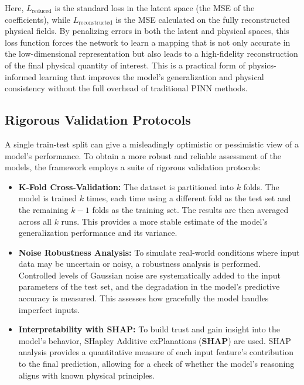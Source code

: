 \documentclass[dsc, EN]{ufabcFHZh}
\begin{document}
{Here, $L_{\text{reduced}}$ is the standard loss in the latent space (the MSE of the coefficients), while $L_{\text{reconstructed}}$ is the MSE calculated on the fully reconstructed physical fields. By penalizing errors in both the latent and physical spaces, this loss function forces the network to learn a mapping that is not only accurate in the low-dimensional representation but also leads to a high-fidelity reconstruction of the final physical quantity of interest. This is a practical form of physics-informed learning that improves the model's generalization and physical consistency without the full overhead of traditional PINN methods.

\subsection{Rigorous Validation Protocols}

A single train-test split can give a misleadingly optimistic or pessimistic view of a model's performance. To obtain a more robust and reliable assessment of the models, the framework employs a suite of rigorous validation protocols:


\begin{itemize}
    \item \textbf{K-Fold Cross-Validation:} The dataset is partitioned into $k$ folds. The model is trained $k$ times, each time using a different fold as the test set and the remaining $k-1$ folds as the training set. The results are then averaged across all $k$ runs. This provides a more stable estimate of the model's generalization performance and its variance.

    \item \textbf{Noise Robustness Analysis:} To simulate real-world conditions where input data may be uncertain or noisy, a robustness analysis is performed. Controlled levels of Gaussian noise are systematically added to the input parameters of the test set, and the degradation in the model's predictive accuracy is measured. This assesses how gracefully the model handles imperfect inputs.

    \item \textbf{Interpretability with SHAP:} To build trust and gain insight into the model's behavior, SHapley Additive exPlanations (\textbf{SHAP}) are used. SHAP analysis provides a quantitative measure of each input feature's contribution to the final prediction, allowing for a check of whether the model's reasoning aligns with known physical principles.
\end{itemize}


}
\end{document}
